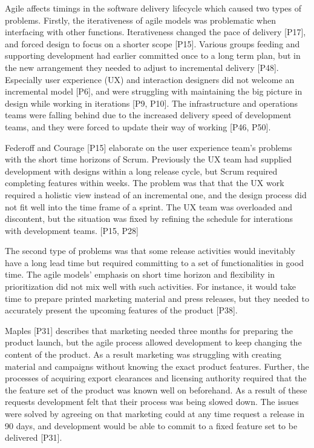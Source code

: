 \documentclass[preprint,authoryear,12pt]{elsarticle}
\begin{document}
Agile affects timings in the software delivery lifecycle which caused two types
of problems. Firstly, the iterativeness of agile models was problematic when
interfacing with other functions. Iterativeness changed the pace of delivery
[P17], and forced design to focus on a shorter scope [P15]. Various groups
feeding and supporting development had earlier committed once to a long term
plan, but in the new arrangement they needed to adjust to incremental delivery
[P48].
Especially user experience (UX) and interaction designers did not welcome an
incremental model [P6], and were struggling with maintaining the big picture in
design while working in iterations [P9, P10].
The infrastructure and operations teams were falling behind due to the increased
delivery speed of development teams, and they were forced to update their way of
working [P46, P50].

Federoff and Courage [P15] elaborate on the user experience team's problems
with the short time horizons of Scrum. Previously the UX team had supplied
development with designs within a long release cycle, but Scrum required
completing features within weeks. The problem was that that the UX work required
a holistic view instead of an incremental one, and the design process did not
fit well into the time frame of a sprint. The UX team was overloaded and
discontent, but the situation was fixed by refining the schedule for interations
with development teams. [P15, P28]

The second type of problems was that some release activities would inevitably
have a long lead time but required committing to a set of functionalities in
good time. The agile models' emphasis on short time horizon and flexibility in
prioritization did not mix well with such activities.
For instance, it would take time to prepare printed marketing material and press
releases, but they needed to accurately present the upcoming features of the
product [P38].

Maples [P31] describes that marketing needed three months for preparing the
product launch, but the agile process allowed development to keep changing the
content of the product. As a result marketing was struggling with creating
material and campaigns without knowing the exact product features. Further, the
processes of acquiring export clearances and licensing authority required that
the the feature set of the product was known well on beforehand.
As a result of these requests development felt that their process was being
slowed down. The issues were solved by agreeing on that marketing could at any
time request a release in 90 days, and development would be able to commit to a
fixed feature set to be delivered [P31].
\end{document}
